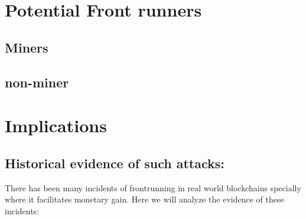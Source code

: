





\section{Potential Front runners} %





\subsection{Miners}

% 



\subsection{non-miner}
% 





\section{Implications} %

\subsection{Historical evidence of such attacks:}\par\noindent
There has been many incidents of frontrunning in real world blockchains specially where it facilitates monetary gain. Here we will analyze the evidence of these incidents:

